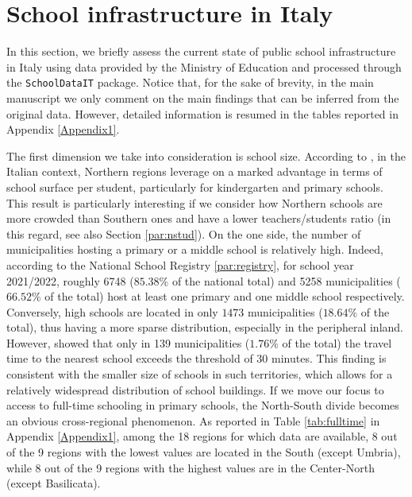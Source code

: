\documentclass{book}
\begin{document}
\section{School infrastructure in Italy} \label{section:Overview}


In this section, we briefly assess the current state of public school infrastructure in Italy using data provided by the Ministry of Education and processed through the \texttt{SchoolDataIT} package. Notice that, for the sake of brevity, in the main manuscript we only comment on the main findings that can be inferred from the original data. However, detailed information is resumed in the tables reported in Appendix \ref{Appendix1}.

The first dimension we take into consideration is school size. According to \cite{BDI}, in the Italian context, Northern regions leverage on a marked advantage in terms of school surface per student, particularly for kindergarten and primary schools. This result is particularly interesting if we consider how Northern schools are more crowded than Southern ones and have a lower teachers/students ratio (in this regard, see also Section \ref{par:nstud}). On the one side, the number of municipalities hosting a primary or a middle school is relatively high. Indeed, according to the National School Registry \ref{par:registry}, for school year 2021/2022, roughly 6748 ($85.38\%$ of the national total) and 5258 municipalities ($66.52\%$ of the total) host at least one primary and one middle school respectively. Conversely, high schools are located in only $1473$ municipalities ($18.64\%$ of the total), thus having a more sparse distribution, especially in the peripheral inland. However, \cite{BDI} showed that only in 139 municipalities ($1.76\%$ of the total) the travel time to the nearest school exceeds the threshold of 30 minutes. This finding is consistent with the smaller size of schools in such territories, which allows for a relatively widespread distribution of school buildings. If we move our focus to access to full-time schooling in primary schools, the North-South divide becomes an obvious cross-regional phenomenon. As reported in Table \ref{tab:fulltime} in Appendix \ref{Appendix1}, among the 18 regions for which data are available, 8 out of the 9 regions with the lowest values are located in the South (except Umbria), while 8 out of the 9 regions with the highest values are in the Center-North (except Basilicata).
\end{document}
